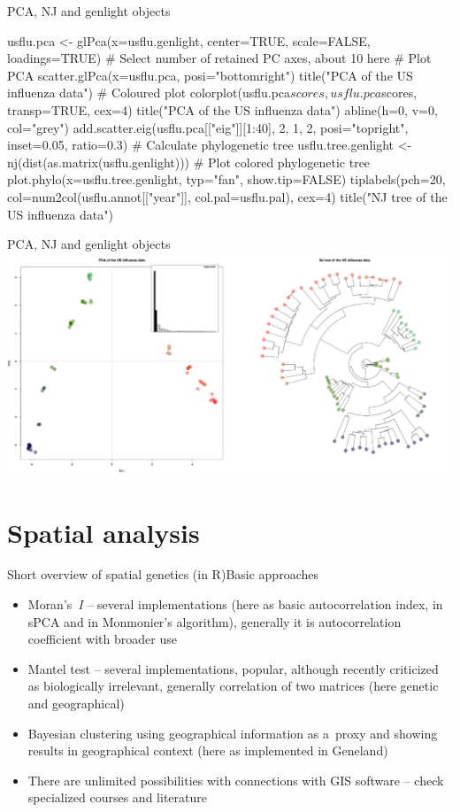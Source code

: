 \documentclass[compress, ucs, xelatex, 11pt, xcolor=svgnames,
  hyperref={
    bookmarks=true,
    unicode=true,
    colorlinks=true,
    pdftitle={Molecular data in R},
    plainpages=false,
    pdfauthor={Vojtech Zeisek},
    pdfsubject={Course about phylogeny and evolution in R},
    pdfcreator={XeLaTeX},
    pdfkeywords={R, evolution, phylogeny, molecular data},
    linkcolor=Tomato,
    anchorcolor=SaddleBrown,
    citecolor=Goldenrod,
    filecolor=DarkMagenta,
    menucolor=Sienna,
    urlcolor=DarkTurquoise,
    pdftex},
  url={hyphens, lowtilde} %
  ]{beamer}
\begin{document}
\begin{frame}[fragile]{PCA, NJ and genlight objects}
  \begin{spluscode}
    usflu.pca <- glPca(x=usflu.genlight, center=TRUE, scale=FALSE,
      loadings=TRUE) # Select number of retained PC axes, about 10 here
    # Plot PCA
    scatter.glPca(x=usflu.pca, posi="bottomright")
    title("PCA of the US influenza data")
    # Coloured plot
    colorplot(usflu.pca$scores, usflu.pca$scores, transp=TRUE, cex=4)
    title("PCA of the US influenza data")
    abline(h=0, v=0, col="grey")
    add.scatter.eig(usflu.pca[["eig"]][1:40], 2, 1, 2, posi="topright",
      inset=0.05, ratio=0.3)
    # Calculate phylogenetic tree
    usflu.tree.genlight <- nj(dist(as.matrix(usflu.genlight)))
    # Plot colored phylogenetic tree
    plot.phylo(x=usflu.tree.genlight, typ="fan", show.tip=FALSE)
    tiplabels(pch=20, col=num2col(usflu.annot[["year"]],
      col.pal=usflu.pal), cex=4)
    title("NJ tree of the US influenza data")
  \end{spluscode}
\end{frame}

\begin{frame}{PCA, NJ and genlight objects}
  \includegraphics[width=\textwidth]{flu_pcoa_nj.png}
\end{frame}

\section{Spatial analysis}

\begin{frame}{Short overview of spatial genetics (in R)}{Basic approaches}
  \begin{itemize}
    \item Moran's~\textit{I} -- several implementations (here as basic autocorrelation index, in sPCA and in Monmonier's algorithm), generally it is autocorrelation coefficient with broader use
    \item Mantel test -- several implementations, popular, although recently criticized as biologically irrelevant, generally correlation of two matrices (here genetic and geographical)
    \item Bayesian clustering using geographical information as a~proxy and showing results in geographical context (here as implemented in Geneland)
    \item There are unlimited possibilities with connections with GIS software -- check specialized courses and literature
  \end{itemize}
\end{frame}
\end{document}
